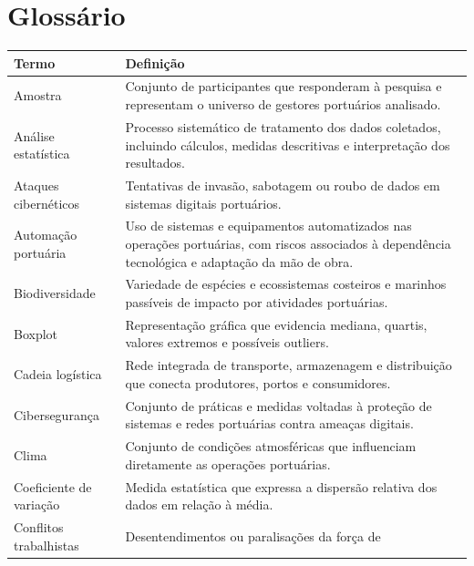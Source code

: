 \documentclass[
  portuguese,
  letterpaper,
  DIV=11,
  numbers=noendperiod]{scrreprt}
\begin{document}
\section{Glossário}\label{glossuxe1rio}

\begin{longtable}[]{@{}
  >{\raggedright\arraybackslash}p{}
  >{\raggedright\arraybackslash}p{}@{}}
\toprule\noalign{}
\begin{minipage}[b]{\linewidth}\raggedright
Termo
\end{minipage} & \begin{minipage}[b]{\linewidth}\raggedright
Definição
\end{minipage} \\
\midrule\noalign{}
\endhead
\bottomrule\noalign{}
\endlastfoot
Amostra & Conjunto de participantes que responderam à pesquisa e
representam o universo de gestores portuários analisado. \\
Análise estatística & Processo sistemático de tratamento dos dados
coletados, incluindo cálculos, medidas descritivas e interpretação dos
resultados. \\
Ataques cibernéticos & Tentativas de invasão, sabotagem ou roubo de
dados em sistemas digitais portuários. \\
Automação portuária & Uso de sistemas e equipamentos automatizados nas
operações portuárias, com riscos associados à dependência tecnológica e
adaptação da mão de obra. \\
Biodiversidade & Variedade de espécies e ecossistemas costeiros e
marinhos passíveis de impacto por atividades portuárias. \\
Boxplot & Representação gráfica que evidencia mediana, quartis, valores
extremos e possíveis outliers. \\
Cadeia logística & Rede integrada de transporte, armazenagem e
distribuição que conecta produtores, portos e consumidores. \\
Cibersegurança & Conjunto de práticas e medidas voltadas à proteção de
sistemas e redes portuárias contra ameaças digitais. \\
Clima & Conjunto de condições atmosféricas que influenciam diretamente
as operações portuárias. \\
Coeficiente de variação & Medida estatística que expressa a dispersão
relativa dos dados em relação à média. \\
Conflitos trabalhistas & Desentendimentos ou paralisações da força de

\end{longtable}
\end{document}
